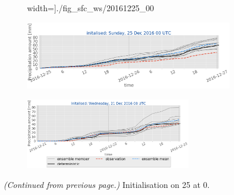 \begin{figure}[H]
\begin{subfigure}[b]{0.75\textwidth}
		width=\textwidth]{./fig_sfc_ws/20161225_00}
		\caption{}\label{fig:res:sfc_ws25}
	\end{subfigure}
	\begin{subfigure}[b]{0.75\textwidth}
		\includegraphics[trim={0.cm 1.5cm 0cm 0cm},clip,
		width=\textwidth]{./fig_sfc_precip/20161225_00}
		\caption{}\label{fig:res:sfc_precip25}
	\end{subfigure}
	\begin{subfigure}[b]{0.8\textwidth}
		\centering
		\includegraphics[trim={5.5cm 0cm 5.cm 17.7cm},clip,
		width=0.8\textwidth]{./fig_sfc_precip/20161221_00_label}
	\end{subfigure}
    \caption{\textit{(Continued from previous page.)} Initialisation on \SI{25}{\dec} at \SI{0}{\UTC}.}
\end{figure}
%
